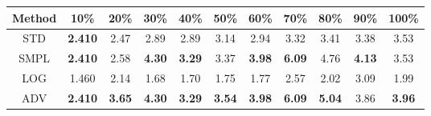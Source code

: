 \documentclass{standalone}
\begin{document}
\begin{tabular}{c|cccccccccc}
      \toprule
      Method & 10\% & 20\% & 30\% & 40\% & 50\% & 60\% & 70\% & 80\% & 90\% & 100\% \\
      \midrule
STD & \textbf{2.410} & 2.47 & 2.89 & 2.89 & 3.14 & 2.94 & 3.32 & 3.41 & 3.38 & 3.53\\
SMPL & \textbf{2.410} & 2.58 & \textbf{4.30} & \textbf{3.29} & 3.37 & \textbf{3.98} & \textbf{6.09} & 4.76 & \textbf{4.13} & 3.53\\
LOG & 1.460 & 2.14 & 1.68 & 1.70 & 1.75 & 1.77 & 2.57 & 2.02 & 3.09 & 1.99\\
ADV & \textbf{2.410} & \textbf{3.65} & \textbf{4.30} & \textbf{3.29} & \textbf{3.54} & \textbf{3.98} & \textbf{6.09} & \textbf{5.04} & 3.86 & \textbf{3.96}\\
  \bottomrule
\end{tabular}
\end{document}
